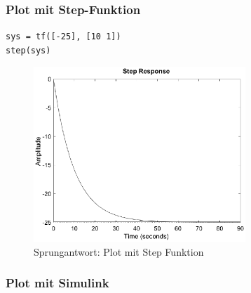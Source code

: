 \subsubsection{Plot mit Step-Funktion}
\texttt{sys = tf([-25], [10 1])}\\
\texttt{step(sys)}\\
\begin{figure}[H]
    \centering
    \includegraphics[width=8cm]{image/PlotMitStepFunktion.eps}
    \caption{Sprungantwort: Plot mit Step Funktion}
\end{figure}
\subsubsection{Plot mit Simulink}
